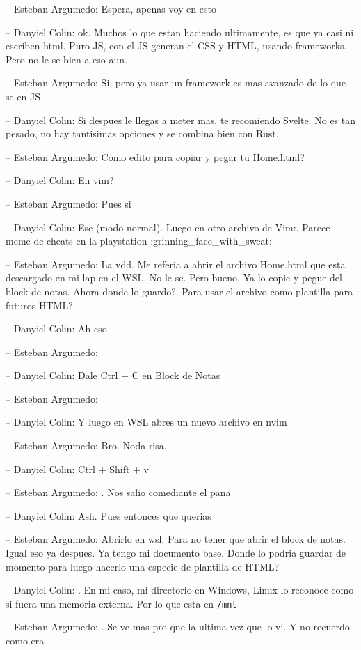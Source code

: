 -- Esteban Argumedo: Espera, apenas voy en esto

-- Danyiel Colin: ok. Muchos lo que estan haciendo ultimamente, es que
ya casi ni escriben html. Puro JS, con el JS generan el CSS y HTML,
usando frameworks. Pero no le se bien a eso aun.

-- Esteban Argumedo: Si, pero ya usar un framework es mas avanzado de lo
que se en JS

-- Danyiel Colin: Si despues le llegas a meter mas, te recomiendo
Svelte. No es tan pesado, no hay tantisimas opciones y se combina bien
con Rust.

-- Esteban Argumedo: Como edito para copiar y pegar tu Home.html?

-- Danyiel Colin: En vim?

-- Esteban Argumedo: Pues si

-- Danyiel Colin: Esc (modo normal). Luego en otro archivo de Vim:.
Parece meme de cheats en la playstation :grinning\_face\_with\_sweat:

-- Esteban Argumedo: La vdd. Me referia a abrir el archivo Home.html que
esta descargado en mi lap en el WSL. No le se. Pero bueno. Ya lo copie y
pegue del block de notas. Ahora donde lo guardo?. Para usar el archivo
como plantilla para futuros HTML?

-- Danyiel Colin: Ah eso

-- Esteban Argumedo:

-- Danyiel Colin: Dale Ctrl + C en Block de Notas

-- Esteban Argumedo:

-- Danyiel Colin: Y luego en WSL abres un nuevo archivo en nvim

-- Esteban Argumedo: Bro. Noda risa.

-- Danyiel Colin: Ctrl + Shift + v

-- Esteban Argumedo: . Nos salio comediante el pana

-- Danyiel Colin: Ash. Pues entonces que querias

-- Esteban Argumedo: Abrirlo en wsl. Para no tener que abrir el block de
notas. Igual eso ya despues. Ya tengo mi documento base. Donde lo podria
guardar de momento para luego hacerlo una especie de plantilla de HTML?

-- Danyiel Colin: . En mi caso, mi directorio en Windows, Linux lo
reconoce como si fuera una memoria externa. Por lo que esta en
\texttt{/mnt}

-- Esteban Argumedo: . Se ve mas pro que la ultima vez que lo vi. Y no
recuerdo como era

